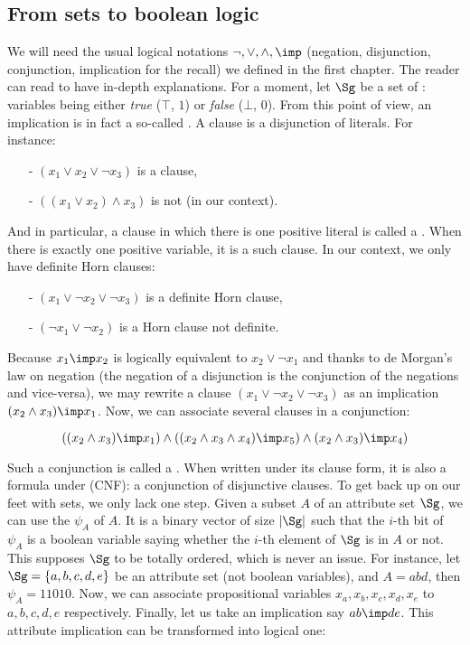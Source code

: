 \subsection{From sets to boolean logic}

We will need the usual logical notations $\lnot, \lor, \land, \imp$ (negation, disjunction, conjunction, implication for the recall) we defined in the first chapter. The reader can read \cite{cori_mathematical_2000} to have in-depth explanations. For a moment, let $\Sg$ be a set of : variables being either \textit{true} ($\top$, $1$) or \textit{false} ($\bot$, $0$). From this
point of view, an implication is in fact a so-called . A clause
is a disjunction of literals. For instance:
\begin{itemize}
	\item[-] $(x_1 \lor x_2 \lor \lnot x_3)$ is a clause,
	\item[-] $((x_1 \lor x_2) \land x_3)$ is not (in our context).
\end{itemize}
\noindent And in particular, a clause in which there is  one
positive literal is called a . When there is exactly one
positive variable, it is a  such clause. In our context, we only have definite Horn clauses:
\begin{itemize}
	\item[-] $(x_1 \lor \lnot x_2 \lor \lnot x_3)$ is a definite Horn clause,
	\item[-] $(\lnot x_1 \lor \lnot x_2)$ is a Horn clause not definite.
\end{itemize}
\noindent Because $x_1 \imp x_2$ is logically equivalent to $x_2 \lor \lnot x_1$
and thanks to de Morgan's law on negation (the negation of a disjunction is the conjunction of the negations and vice-versa), we may rewrite a clause $(x_1 \lor \lnot x_2 \lor \lnot x_3)$ as an implication $(x_2 \land x_3) \imp x_1$. 
Now, we can associate several clauses in a conjunction:

\[ ((x_2 \land x_3) \imp x_1) \land ((x_2 \land x_3 \land x_4) \imp x_5) 
\land (x_2 \land x_3) \imp x_4) \]

\noindent Such a conjunction is called a . When written
under its clause form, it is also a formula under  (CNF): a conjunction of disjunctive clauses. To get back up on our feet
with sets, we only lack one step. Given a subset $A$ of an attribute set $\Sg$, we can use the  $\psi_A$ of $A$. It is a binary vector of size $|\Sg|$ such that the $i$-th bit of $\psi_A$ is a boolean variable saying whether the $i$-th element of $\Sg$ is in $A$ or not. This supposes $\Sg$ to be totally ordered, which is never an issue. For instance,
let $\Sg = \{ a, b, c, d, e\}$ be an attribute set (not boolean variables),
and $A = abd$, then $\psi_A = 11010$. Now, we can associate propositional variables $x_a, x_b, x_c, x_d, x_e$ to $a, b, c, d, e$ respectively. Finally,
let us take an implication say $ab \imp de$. This attribute implication can be
transformed into logical one:

